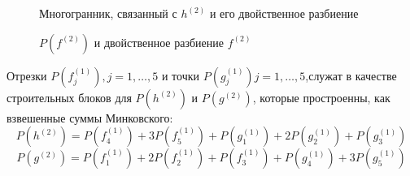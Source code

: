 \documentclass[russian]{lecture-notes}
\begin{document}
	\begin{figure}[!ht]
		\caption{Многогранник, связанный с $h^{(2)}$ и его двойственное разбиение}
		
	\end{figure}
	\begin{figure}[!ht]
		\caption{$P(f^{(2)})$ и двойственное разбиение $f^{(2)}$}
	\end{figure}
	

	Отрезки $P(f_j^{(1)}), j =1,\dots,5$ и точки $P(g_j^{(1)})j =1,\dots,5$,служат в качестве строительных блоков для $P(h^{(2)})$ и $P(g^{(2)})$, которые простроенны, как взвешенные суммы Минковского:
	\[
		P(h^{(2)}) = P(f^{(1)}_4) +  3P(f^{(1)}_5) +  P(g^{(1)}_1) + 2P(g^{(1)}_2) + P(g^{(1)}_3)
	\]
	\[
		P(g^{(2)}) = P(f^{(1)}_1) +  2P(f^{(1)}_2) +  P(f^{(1)}_3) + P(g^{(1)}_4) + 3P(g^{(1)}_5)
	\]
	
\end{document}
